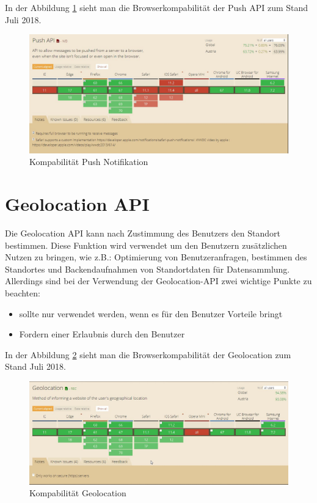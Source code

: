 In der Abbildung \ref{fig:BrowserPushAPI} sieht man die Browserkompabilität der Push API zum Stand Juli 2018.
\begin{figure}[h]
	\centering
	\includegraphics[width=14cm]{BilderAllgemein/BrowserPushAPI}\medskip
	\caption{Kompabilität Push Notifikation \cite{BrowserSupport}}
	\label{fig:BrowserPushAPI}
\end{figure}




\newpage
\section{Geolocation API}
Die Geolocation API kann nach Zustimmung des Benutzers den Standort bestimmen. Diese Funktion wird verwendet  um den Benutzern zusätzlichen Nutzen zu bringen, wie z.B.: Optimierung von Benutzeranfragen, bestimmen des Standortes und Backendaufnahmen von Standortdaten für Datensammlung. 
Allerdings sind bei der Verwendung der Geolocation-API zwei wichtige Punkte zu beachten:

\begin{itemize}
    \item  sollte nur verwendet werden, wenn es für den Benutzer Vorteile bringt 
	\item  Fordern einer Erlaubnis durch den Benutzer  
\end{itemize}




In der Abbildung \ref{fig:BrowserGL} sieht man die Browserkompabilität der Geolocation zum Stand Juli 2018.
\begin{figure}[h]
	\centering
	\includegraphics[width=14cm]{BilderAllgemein/BrowserGL}\medskip
	\caption{Kompabilität Geolocation \cite{BrowserSupport}}
	\label{fig:BrowserGL}
\end{figure}









